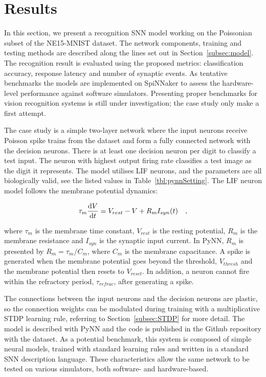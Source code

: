 \section{Results}
\label{sec:test}
In this section, we present a recognition SNN model working on the Poissonian subset of the NE15-MNIST dataset.
The network components, training and testing methods are described along the lines set out in Section~\ref{subsec:model}.
The recognition result is evaluated using the proposed metrics: classification accuracy, response latency and number of synaptic events.
As tentative benchmarks the models are implemented on SpiNNaker to assess the hardware-level performance against software simulators.
Presenting proper benchmarks for vision recognition systems is still under investigation; the case study only make a first attempt.

The case study is a simple two-layer network where the input neurons receive Poisson spike trains from the dataset and form a fully connected network with the decision neurons.
There is at least one decision neuron per digit to classify a test input.
The neuron with highest output firing rate classifies a test image as the digit it represents.
The model utilises LIF neurons, and the parameters are all biologically valid, see the listed values in Table~\ref{tbl:pynnSetting}.
The LIF neuron model follows the membrane potential dynamics:

\begin{equation}
\tau_m \frac{\mathrm{d} V}{\mathrm{d} t}=V_{rest} - V + R_{m} I_{syn}(t) ~~~,
\label{eq:LIF}
\end{equation}

where $\tau_m$ is the membrane time constant, $ V_{rest} $ is the resting potential, $ R_{m} $ is the membrane resistance and $ I_{syn} $ is the synaptic input current.
In PyNN, $ R_{m} $ is presented by $ R_{m}=\tau_m/C_{m} $, where $C_{m} $ is the membrane capacitance.
A spike is generated when the membrane potential goes beyond the threshold, $ V_{thresh} $ and the membrane potential then resets to $V_{reset}$.
In addition, a neuron cannot fire within the refractory period, $ \tau_{refrac} $, after generating a spike.

The connections between the input neurons and the decision neurons are plastic, so the connection weights can be modulated during training with a multiplicative STDP learning rule, referring to Section~\ref{subsec:STDP} for more detail.
The model is described with PyNN and the code is published in
the Github repository with the dataset.
As a potential benchmark, this system is composed of simple neural models, trained with standard learning rules and written in a standard SNN description language. These characteristics allow the same network to be tested on various simulators, both software- and hardware-based.

